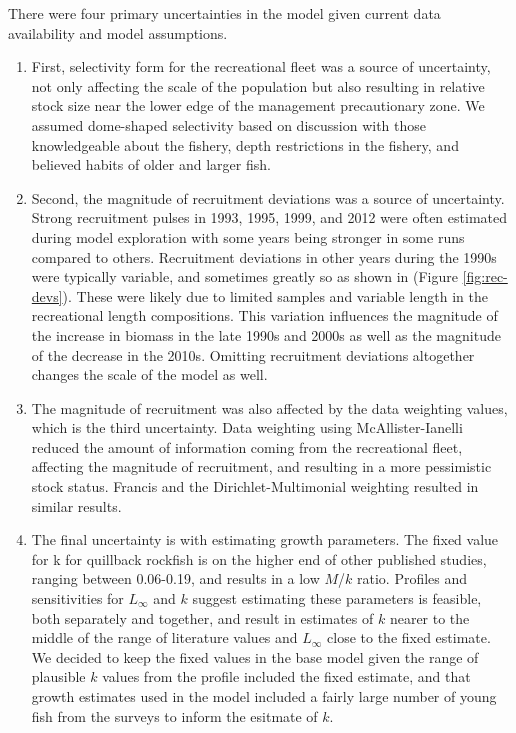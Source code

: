 \documentclass[11pt,
  english,
  a4paper,
]{article}
\begin{document}
\leavevmode\tagmcend\tagstructend

There were four primary uncertainties in the model given current data availability and model assumptions.

\begin{enumerate}

  \item First, selectivity form for the recreational fleet was a source of uncertainty, not only affecting the scale of the population but also resulting in relative stock size near the lower edge of the management precautionary zone. We assumed dome-shaped selectivity based on discussion with those knowledgeable about the fishery, depth restrictions in the fishery, and believed habits of older and larger fish.
  
  \item Second, the magnitude of recruitment deviations was a source of uncertainty. Strong recruitment pulses in 1993, 1995, 1999, and 2012 were often estimated during model exploration with some years being stronger in some runs compared to others. Recruitment deviations in other years during the 1990s were typically variable, and sometimes greatly so as shown in (Figure \ref{fig:rec-devs}). These were likely due to limited samples and variable length in the recreational length compositions. This variation influences the magnitude of the increase in biomass in the late 1990s and  2000s as well as the magnitude of the decrease in the 2010s. Omitting recruitment deviations altogether changes the scale of the model as well. 
  
  \item The magnitude of recruitment was also affected by the data weighting values, which is the third uncertainty. Data weighting using McAllister-Ianelli reduced the amount of information coming from the recreational fleet, affecting the magnitude of recruitment, and resulting in a more pessimistic stock status. Francis and the Dirichlet-Multimonial weighting resulted in similar results. 
  
  \item The final uncertainty is with estimating growth parameters. The fixed value for k for quillback rockfish is on the higher end of other published studies, ranging between 0.06-0.19, and results in a low $M$/$k$ ratio. Profiles and sensitivities for $L_{\infty}$ and $k$ suggest estimating these parameters is feasible, both separately and together, and result in estimates of $k$ nearer to the middle of the range of literature values and $L_{\infty}$ close to the fixed estimate. We decided to keep the fixed values in the base model given the range of plausible $k$ values from the profile included the fixed estimate, and that growth estimates used in the model included a fairly large number of young fish from the surveys to inform the esitmate of $k$.  
  
\end{enumerate}
\end{document}
